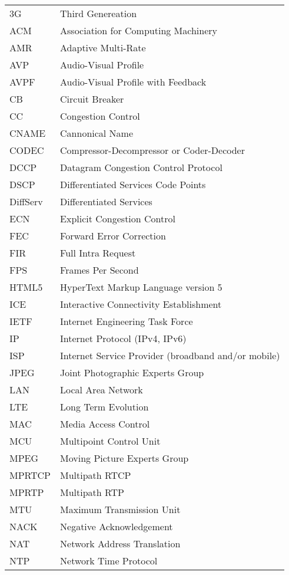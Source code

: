 \begin{longtable}{ll}
3G  	& Third Genereation \\
ACM 	& Association for Computing Machinery \\
AMR 	& Adaptive Multi-Rate \\
AVP 	& Audio-Visual Profile \\
AVPF	& Audio-Visual Profile with Feedback \\
CB  	& Circuit Breaker \\
CC  	& Congestion Control \\
CNAME	& Cannonical Name \\
CODEC	& Compressor-Decompressor or Coder-Decoder \\
DCCP 	& Datagram Congestion Control Protocol \\
DSCP 	& Differentiated Services Code Points \\
DiffServ	& Differentiated Services \\
ECN  	& Explicit Congestion Control \\
FEC  	& Forward Error Correction \\
FIR 	& Full Intra Request \\
FPS 	& Frames Per Second \\
HTML5	& HyperText Markup Language version 5\\
ICE  	& Interactive Connectivity Establishment \\
IETF	& Internet Engineering Task Force \\
IP  	& Internet Protocol (IPv4, IPv6)\\
ISP 	& Internet Service Provider (broadband and/or mobile) \\
JPEG 	& Joint Photographic Experts Group \\
LAN 	& Local Area Network \\
LTE 	& Long Term Evolution \\
MAC 	& Media Access Control \\
MCU 	& Multipoint Control Unit \\
MPEG 	& Moving Picture Experts Group \\
MPRTCP	& Multipath RTCP \\
MPRTP 	& Multipath RTP \\
MTU  	& Maximum Transmission Unit \\
NACK 	& Negative Acknowledgement \\
NAT 	& Network Address Translation \\
NTP  	& Network Time Protocol \\

\end{longtable}
